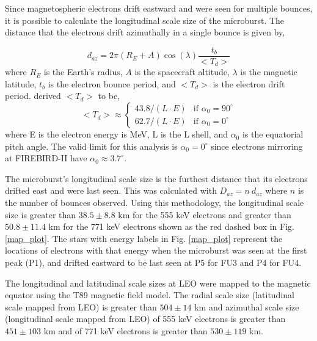 \documentclass[draft,linenumbers]{agujournal}
\begin{document}
Since magnetospheric electrons drift eastward and were seen for multiple bounces, it is possible to calculate the longitudinal scale size of the microburst. The distance that the electrons drift azimuthally in a single bounce is given by, 

\begin{equation}
d_{az} = 2 \pi (R_E + A) \cos(\lambda) \frac{t_b}{<T_{d}>}
\label{bounce_drift}
\end{equation} where $R_E$ is the Earth's radius, $A$ is the spacecraft altitude, $\lambda$ is the magnetic latitude, $t_b$ is the electron bounce period, and $<T_{d}>$ is the electron drift period. \citet{Parks03} derived $<T_{d}>$ to be,
\begin{equation}
<T_{d}> \approx
\begin{cases}
43.8 /(L \cdot E) & \text{if } \alpha_0 = 90^{\circ} \\    62.7/(L \cdot E) & \text{if } \alpha_0 = 0^{\circ}
\end{cases}
\label{drift}
\end{equation} where E is the electron energy is MeV, L is the L shell, and $\alpha_0$ is the equatorial pitch angle. The valid limit for this analysis is $\alpha_0 = 0^{\circ}$ since electrons mirroring at FIREBIRD-II have $\alpha_0 \approx 3.7^{\circ}$. 

The microburst's longitudinal scale size is the furthest distance that its electrons drifted east and were last seen. This was calculated with $D_{az} = n \ d_{az}$ where $n$ is the number of bounces observed. Using this methodology, the longitudinal scale size is greater than $ 38.5 \pm 8.8$ km for the 555 keV electrons and greater than $ 50.8 \pm 11.4$ km for the 771 keV electrons shown as the red  dashed box in Fig. \ref{map_plot}. The stars with energy labels in Fig. \ref{map_plot} represent the locations of electrons with that energy when the microburst was seen at the first peak (P1), and drifted eastward to be last seen at P5 for FU3 and P4 for FU4.

The longitudinal and latitudinal scale sizes at LEO were mapped to the magnetic equator using the T89 magnetic field model. The radial scale size (latitudinal scale mapped from LEO) is greater than $504 \pm​ 14$ km and azimuthal scale size (longitudinal scale mapped from LEO) of 555 keV electrons is greater than $451 \pm 103$ km and of 771 keV electrons is greater than $530 \pm 119$ km.
\end{document}
